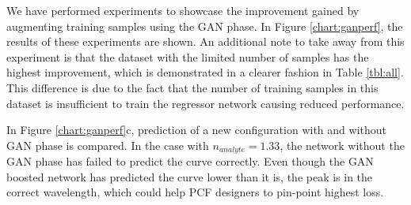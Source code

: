 \documentclass[journal]{IEEEtran}
\begin{document}
We have performed experiments to showcase the improvement gained by augmenting training samples using the GAN phase. In Figure \ref{chart:ganperf}, the results of these experiments are shown. An additional note to take away from this experiment is that the dataset with the limited number of samples has the highest improvement, which is demonstrated in a clearer fashion in Table \ref{tbl:all}. This difference is due to the fact that the number of training samples in this dataset is insufficient to train the regressor network causing reduced performance.

In Figure \ref{chart:ganperf}c, prediction of a new configuration with and without GAN phase is compared. In the case with $n_{analyte} = 1.33$, the network without the GAN phase has failed to predict the curve correctly. Even though the GAN boosted network has predicted the curve lower than it is, the peak is in the correct wavelength, which could help PCF designers to pin-point highest loss.
\end{document}
